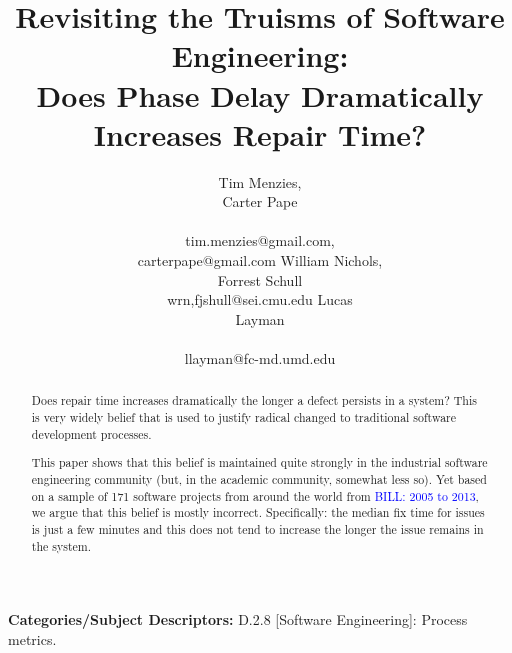 \documentclass{sig-alternate}
\newcommand{\bill}[1]{\textcolor{blue}{BILL: #1}}
\begin{document}
\title{Revisiting the Truisms of Software Engineering:\\ Does Phase Delay Dramatically Increases  Repair Time?}
\author{
\alignauthor
Tim Menzies, \\Carter Pape\\
       \\
       tim.menzies@gmail.com,\\carterpape@gmail.com
\alignauthor
William Nichols,\\ Forrest Schull\\
wrn,fjshull@sei.cmu.edu
\alignauthor
Lucas \\Layman\\
       \\ 
       llayman@fc-md.umd.edu
} 


 
\maketitle
\begin{abstract}
Does
repair time increases dramatically
the longer a defect persists in a system?
This  is very widely belief that is used to justify 
radical changed to    traditional software development
 processes.

This paper shows that this belief is maintained
quite strongly in the industrial software engineering
community (but, in the academic community, somewhat less so).
Yet based on a sample of 
171 software projects from around the world from 
\bill{2005 to 2013}, we argue that this belief is mostly 
incorrect. Specifically: the median fix time for issues
is just a few minutes and this does not tend to increase
the longer the issue remains in the system. 

\end{abstract}

\vspace{1mm}
\noindent
{\bf Categories/Subject Descriptors:} 
D.2.8 [Software Engineering]: Process metrics.

 
\end{document}
